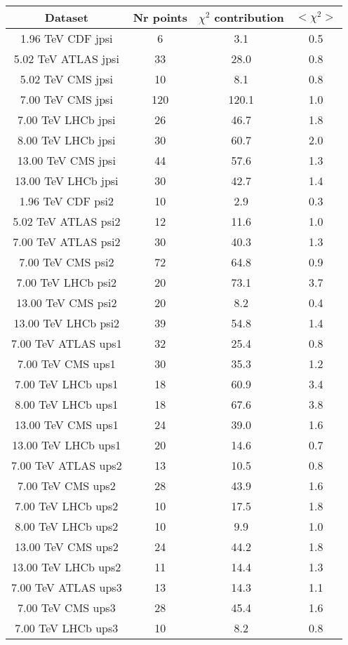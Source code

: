 \begin{table}[h!]
\centering
\begin{tabular}{c|c|c|c}
Dataset & Nr points & $\chi^2$ contribution & $<\chi^2>$ \\
\hline
1.96 TeV CDF jpsi & 6 & 3.1 & 0.5 \\
5.02 TeV ATLAS jpsi & 33 & 28.0 & 0.8 \\
5.02 TeV CMS jpsi & 10 & 8.1 & 0.8 \\
7.00 TeV CMS jpsi & 120 & 120.1 & 1.0 \\
7.00 TeV LHCb jpsi & 26 & 46.7 & 1.8 \\
8.00 TeV LHCb jpsi & 30 & 60.7 & 2.0 \\
13.00 TeV CMS jpsi & 44 & 57.6 & 1.3 \\
13.00 TeV LHCb jpsi & 30 & 42.7 & 1.4 \\
1.96 TeV CDF psi2 & 10 & 2.9 & 0.3 \\
5.02 TeV ATLAS psi2 & 12 & 11.6 & 1.0 \\
7.00 TeV ATLAS psi2 & 30 & 40.3 & 1.3 \\
7.00 TeV CMS psi2 & 72 & 64.8 & 0.9 \\
7.00 TeV LHCb psi2 & 20 & 73.1 & 3.7 \\
13.00 TeV CMS psi2 & 20 & 8.2 & 0.4 \\
13.00 TeV LHCb psi2 & 39 & 54.8 & 1.4 \\
7.00 TeV ATLAS ups1 & 32 & 25.4 & 0.8 \\
7.00 TeV CMS ups1 & 30 & 35.3 & 1.2 \\
7.00 TeV LHCb ups1 & 18 & 60.9 & 3.4 \\
8.00 TeV LHCb ups1 & 18 & 67.6 & 3.8 \\
13.00 TeV CMS ups1 & 24 & 39.0 & 1.6 \\
13.00 TeV LHCb ups1 & 20 & 14.6 & 0.7 \\
7.00 TeV ATLAS ups2 & 13 & 10.5 & 0.8 \\
7.00 TeV CMS ups2 & 28 & 43.9 & 1.6 \\
7.00 TeV LHCb ups2 & 10 & 17.5 & 1.8 \\
8.00 TeV LHCb ups2 & 10 & 9.9 & 1.0 \\
13.00 TeV CMS ups2 & 24 & 44.2 & 1.8 \\
13.00 TeV LHCb ups2 & 11 & 14.4 & 1.3 \\
7.00 TeV ATLAS ups3 & 13 & 14.3 & 1.1 \\
7.00 TeV CMS ups3 & 28 & 45.4 & 1.6 \\
7.00 TeV LHCb ups3 & 10 & 8.2 & 0.8 \\

\end{tabular}
\end{table}
